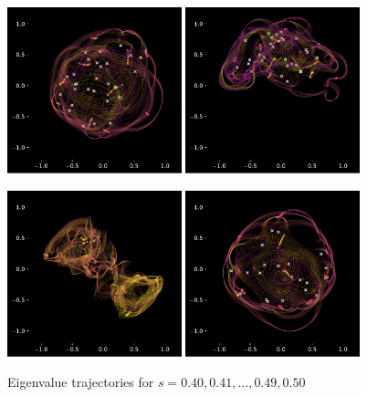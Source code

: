 \documentclass{article}
\begin{document}
	\newpage

	\begin{figure}[htbp]
		\centering
		\includegraphics[width=0.45\textwidth]{figures/N10Circle04to05.pdf}
		\includegraphics[width=0.45\textwidth]{figures/N10Meander04to05.pdf}

		\includegraphics[width=0.45\textwidth]{figures/N10Crossing04to05.pdf}
		\includegraphics[width=0.45\textwidth]{figures/N10Circle04to05B.pdf}
		\caption{Eigenvalue trajectories for $s= 0.40, 0.41, \dots , 0.49, 0.50$ }
		\label{fig:pdf_image}
	\end{figure}
\end{document}

